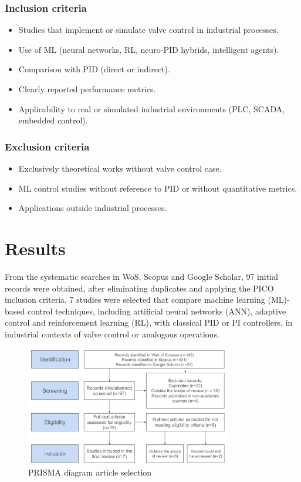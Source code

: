 \documentclass{article}
\begin{document}
\subsubsection{Inclusion criteria}

\begin{itemize}
  \item Studies that implement or simulate valve control in industrial processes.
  \item Use of ML (neural networks, RL, neuro-PID hybrids, intelligent agents).
  \item Comparison with PID (direct or indirect).
  \item Clearly reported performance metrics.
  \item Applicability to real or simulated industrial environments (PLC, SCADA, embedded control).
\end{itemize}

\subsubsection{Exclusion criteria}

\begin{itemize}
  \item Exclusively theoretical works without valve control case.
  \item ML control studies without reference to PID or without quantitative metrics.
  \item Applications outside industrial processes.
\end{itemize}

\section{Results}

From the systematic searches in WoS, Scopus and Google Scholar, 97 initial records were obtained, after eliminating duplicates and applying the PICO inclusion criteria, 
7 studies were selected that compare machine learning (ML)-based control techniques, including artificial neural networks (ANN), adaptive control and 
reinforcement learning (RL), with classical PID or PI controllers, in industrial contexts of valve control or analogous operations.

\begin{figure}[H]
  \centering
  \includegraphics[width=0.8\textwidth]{img/prisma_chart.png}
  \caption{PRISMA diagram article selection}
  \label{fig:comparacion_ml_pid}
\end{figure}
\end{document}
